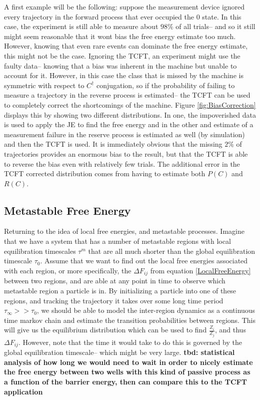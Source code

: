 \documentclass[paper=a4, fontsize=10pt]{article} %
\numberwithin{equation}{section} %
\numberwithin{figure}{section} %
\numberwithin{table}{section} %
\def\tbf #1{\textbf{#1} }
\begin{document}
 A first example will be the following: suppose the measurement device ignored every trajectory in the forward process that ever occupied the $0$ state. In this case, the experiment is still able to measure about $98\%$ of all trials-- and so it still might seem reasonable that it wont bias the free energy estimate too much. However, knowing that even rare events can dominate the free energy estimate, this might not be the case. Ignoring the TCFT, an experiment might use the faulty data-- knowing that a bias was inherent in the machine but unable to account for it. However, in this case the class that is missed by the machine is symmetric with respect to $C^\dagger$ conjugation, so if the probability of failing to measure a trajectory in the reverse process is estimated-- the TCFT can be used to completely correct the shortcomings of the machine. Figure \ref{fig:BiasCorrection} displays this by showing two different distributions. In one, the impoverished data is used to apply the JE to find the free energy and in the other and estimate of a measurement failure in the reserve process is estimated as well (by simulation) and then the TCFT is used. It is immediately obvious that the missing $2\%$ of trajectories provides an enormous bias to the result, but that the TCFT is able to reverse the bias even with relatively few trials. The additional error in the TCFT corrected distribution comes from having to estimate both $P(C)$ and $R(C)$.

\subsection{Metastable Free Energy}
Returning to the idea of  local free energies, and metastable processes. Imagine that we have a system that has a number of metastable regions with local equilibration timescales $\tau^m$ that are all much shorter than the global equilibration timescale $\tau_0$. Assume that we want to find out the local free energies associated with each region, or more specifically, the $\Delta F_{ij}$ from equation \ref{LocalFreeEnergy} between two regions, and are able at any point in time to observe which metastable region a particle is in. By initializing a particle into one of these regions, and tracking the trajectory it takes over some long time period $\tau_\infty >> \tau_0$, we should be able to model the inter-region dynamics as a continuous time markov chain and estimate the transition probabilities between regions. This will give us the equilibrium distribution which can be used to find $\frac{Z_i}{Z_j}$, and thus $\Delta F_{ij}$. However, note that the time it would take to do this is governed by the global equilibration timescale-- which might be very large. \tbf{tbd: statistical analysis of how long we would need to wait in order to nicely estimate the free energy between two wells with this kind of passive process as a function of the barrier energy, then can compare this to the TCFT application}
\end{document}
